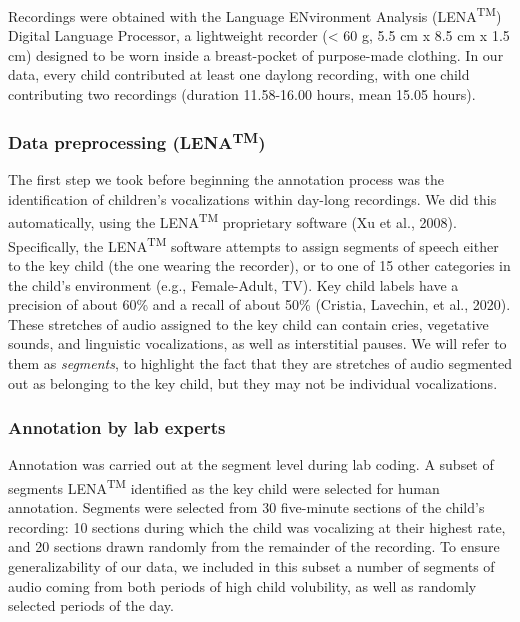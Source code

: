 \documentclass[english,,man,floatsintext]{apa6}
\begin{document}
Recordings were obtained with the Language ENvironment Analysis (LENA\textsuperscript{TM}) Digital Language Processor, a lightweight recorder (\textless{} 60 g, 5.5 cm x 8.5 cm x 1.5 cm) designed to be worn inside a breast-pocket of purpose-made clothing. In our data, every child contributed at least one daylong recording, with one child contributing two recordings (duration 11.58-16.00 hours, mean 15.05 hours).

\hypertarget{data-preprocessing-lenatm}{%
\subsubsection{\texorpdfstring{Data preprocessing (LENA\textsuperscript{TM})}{Data preprocessing (LENATM)}}\label{data-preprocessing-lenatm}}

The first step we took before beginning the annotation process was the identification of children's vocalizations within day-long recordings. We did this automatically, using the LENA\textsuperscript{TM} proprietary software (Xu et al., 2008). Specifically, the LENA\textsuperscript{TM} software attempts to assign segments of speech either to the key child (the one wearing the recorder), or to one of 15 other categories in the child's environment (e.g., Female-Adult, TV). Key child labels have a precision of about 60\% and a recall of about 50\% (Cristia, Lavechin, et al., 2020). These stretches of audio assigned to the key child can contain cries, vegetative sounds, and linguistic vocalizations, as well as interstitial pauses. We will refer to them as \emph{segments}, to highlight the fact that they are stretches of audio segmented out as belonging to the key child, but they may not be individual vocalizations.

\hypertarget{annotation-by-lab-experts}{%
\subsubsection{Annotation by lab experts}\label{annotation-by-lab-experts}}

Annotation was carried out at the segment level during lab coding. A subset of segments LENA\textsuperscript{TM} identified as the key child were selected for human annotation. Segments were selected from 30 five-minute sections of the child's recording: 10 sections during which the child was vocalizing at their highest rate, and 20 sections drawn randomly from the remainder of the recording. To ensure generalizability of our data, we included in this subset a number of segments of audio coming from both periods of high child volubility, as well as randomly selected periods of the day.
\end{document}
